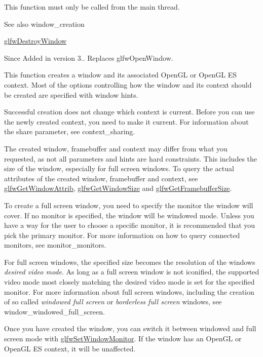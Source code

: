 This function must only be called from the main thread.

\begin{DoxySeeAlso}{See also}
window\+\_\+creation 

\hyperlink{group__window_ga806747476b7247d292be3711c323ea10}{glfw\+Destroy\+Window}
\end{DoxySeeAlso}
\begin{DoxySince}{Since}
Added in version 3.. Replaces {\ttfamily glfw\+Open\+Window}.
\end{DoxySince}
This function creates a window and its associated Open\+GL or Open\+GL ES context. Most of the options controlling how the window and its context should be created are specified with window hints.

Successful creation does not change which context is current. Before you can use the newly created context, you need to make it current. For information about the {\ttfamily share} parameter, see context\+\_\+sharing.

The created window, framebuffer and context may differ from what you requested, as not all parameters and hints are hard constraints. This includes the size of the window, especially for full screen windows. To query the actual attributes of the created window, framebuffer and context, see \hyperlink{group__window_ga1bb0c7e100418e284dbb800789c63d40}{glfw\+Get\+Window\+Attrib}, \hyperlink{group__window_ga7feb769ebb3f3d21579b5a3fb07be76e}{glfw\+Get\+Window\+Size} and \hyperlink{group__window_gaf7d17f3534b4b6dc9a6f905e3a240b7e}{glfw\+Get\+Framebuffer\+Size}.

To create a full screen window, you need to specify the monitor the window will cover. If no monitor is specified, the window will be windowed mode. Unless you have a way for the user to choose a specific monitor, it is recommended that you pick the primary monitor. For more information on how to query connected monitors, see monitor\+\_\+monitors.

For full screen windows, the specified size becomes the resolution of the window\textquotesingle{}s {\itshape desired video mode}. As long as a full screen window is not iconified, the supported video mode most closely matching the desired video mode is set for the specified monitor. For more information about full screen windows, including the creation of so called {\itshape windowed full screen} or {\itshape borderless full screen} windows, see window\+\_\+windowed\+\_\+full\+\_\+screen.

Once you have created the window, you can switch it between windowed and full screen mode with \hyperlink{group__window_ga12fabf78575e59c00f822f323ae0b6ae}{glfw\+Set\+Window\+Monitor}. If the window has an Open\+GL or Open\+GL ES context, it will be unaffected.

